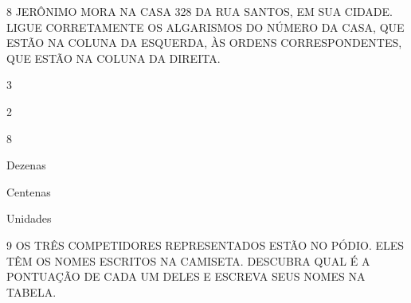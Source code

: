 \num{8} JERÔNIMO MORA NA CASA 328 DA RUA SANTOS, EM SUA
CIDADE. LIGUE CORRETAMENTE OS ALGARISMOS DO NÚMERO DA CASA,
QUE ESTÃO NA COLUNA DA ESQUERDA, ÀS ORDENS CORRESPONDENTES,
QUE ESTÃO NA COLUNA DA DIREITA.

\begin{multicols}{2}
3

2

8

\columnbreak

Dezenas

Centenas

Unidades
\end{multicols}





\num{9} OS TRÊS COMPETIDORES REPRESENTADOS ESTÃO NO PÓDIO. ELES TÊM OS NOMES ESCRITOS NA CAMISETA. DESCUBRA QUAL É A PONTUAÇÃO DE CADA UM DELES E ESCREVA SEUS NOMES NA TABELA.


